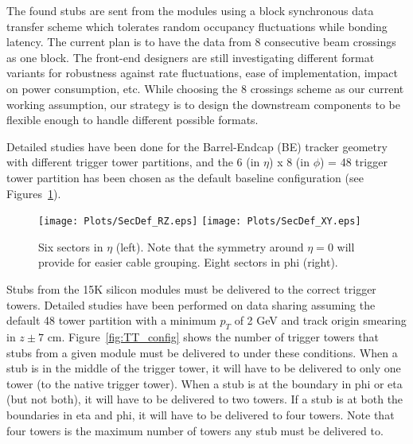 \noindent The found stubs are sent from the modules using a block synchronous data transfer scheme which tolerates random occupancy fluctuations while bonding latency. The current plan is to have the data from 8 consecutive beam crossings as one block. The front-end designers are still investigating different format variants for robustness against rate fluctuations, ease of implementation, impact on power consumption, etc. While choosing the 8 crossings scheme as our current working assumption, our strategy is to design the downstream components to be flexible enough to handle different possible formats. 

\noindent Detailed studies have been done for the Barrel-Endcap (BE) tracker geometry with different trigger tower partitions, and the 6 (in $\eta$) x 8 (in $\phi$) = 48 trigger tower partition has been chosen as the default baseline configuration (see Figures~\ref{fig:SecDef_RZ}).

\begin{figure}[ht!]
\centering
\texttt{[image: Plots/SecDef\_RZ.eps]}
\texttt{[image: Plots/SecDef\_XY.eps]}
\caption{Six sectors in $\eta$ (left). Note that the symmetry around $\eta=0$ will provide for easier cable grouping. Eight sectors in phi (right).}
\label{fig:SecDef_RZ}
\end{figure}


\noindent Stubs from the 15K silicon modules must be delivered to the correct trigger towers. 
Detailed studies have been performed on data sharing assuming the default 48 tower partition with a minimum $p_T$ of 2 GeV and track origin smearing in $z\pm 7$ cm. Figure~\ref{fig:TT_config} shows the number of trigger towers that stubs from a given module must be delivered to under these conditions. When a stub is in the middle of the trigger tower, it will have to be delivered to only one tower (to the native trigger tower). When a stub is at the boundary in phi or eta (but not both), it will have to be delivered to two towers. If a stub is at both the boundaries in eta and phi, it will have to be delivered to four towers. Note that four towers is the maximum number of towers any stub must be delivered to. 



